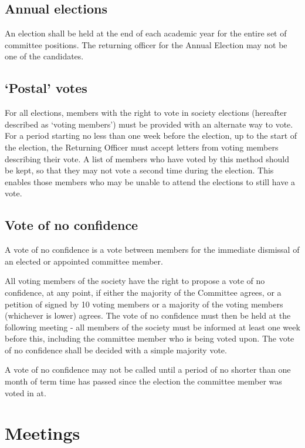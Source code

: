 \documentclass{report}
\begin{document}
	\subsection{Annual elections}
	
	An election shall be held at the end of each academic year for the entire set of committee positions. The returning officer for the Annual Election may not be one of the candidates.
	
	\subsection{`Postal' votes}
	
	For all elections, members with the right to vote in society elections (hereafter described as `voting members') must be provided with an alternate way to vote. For a period starting no less than one week before the election, up to the start of the election, the Returning Officer must accept letters from voting members describing their vote. A list of members who have voted by this method should be kept, so that they may not vote a second time during the election. This enables those members who may be unable to attend the elections to still have a vote.

\subsection{Vote of no confidence}

A vote of no confidence is a vote between members for the immediate dismissal of an elected or appointed committee member.

All voting members of the society have the right to propose a vote of no confidence, at any point, if either the majority of the Committee agrees, or a petition of signed by 10 voting members or a majority of the voting members (whichever is lower) agrees. The vote of no confidence must then be held at the following meeting - all members of the society must be informed at least one week before this, including the committee member who is being voted upon. The vote of no confidence shall be decided with a simple majority vote.

A vote of no confidence may not be called until a period of no shorter than one month of term time has passed since the election the committee member was voted in at.

\newpage
\section{Meetings}
\label{meetings}
\end{document}
